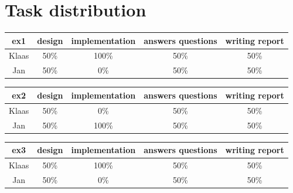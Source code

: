 \documentclass[a4paper]{article}
\begin{document}
\section*{Task distribution}

\begin{table}[H]
\begin{tabular}{ccccc}
ex1 & design & implementation & answers questions & writing report \\
\hline
Klaas & 50\% & 100\% & 50\% & 50\% \\
\hline
Jan & 50\% & 0\% & 50\% & 50\% \\
\end{tabular}
\end{table}

\begin{table}[H]
\begin{tabular}{ccccc}
ex2 & design & implementation & answers questions & writing report \\
\hline
Klaas & 50\% & 0\% & 50\% & 50\% \\
\hline
Jan & 50\% & 100\% & 50\% & 50\% \\
\end{tabular}
\end{table}

\begin{table}[H]
\begin{tabular}{ccccc}
ex3 & design & implementation & answers questions & writing report \\
\hline
Klaas & 50\% & 100\% & 50\% & 50\% \\
\hline
Jan & 50\% & 0\% & 50\% & 50\% \\
\end{tabular}
\end{table}
\end{document}
